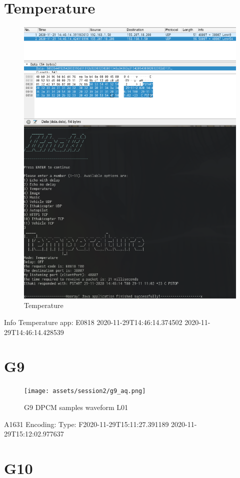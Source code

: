 \documentclass[hidelinks, 12pt, a4paper]{article}
\begin{document}
\section{Temperature}

\begin{figure}[h!]
\centering
	\includegraphics[height=.38\textheight, width=.8\textwidth]{assets/session2/temp.png}
	\caption{Temperature} 
\end{figure}
Info Temperature app:
E0818 
2020-11-29T14:46:14.374502
2020-11-29T14:46:14.428539


\section{G9}

\begin{figure}[h!]
\centering
	\texttt{[image: assets/session2/g9\_aq.png]}
	\caption{G9 DPCM samples waveform L01} 
\end{figure}
A1631
Encoding: 
Type: F2020-11-29T15:11:27.391189
2020-11-29T15:12:02.977637

\section{G10}
\end{document}
